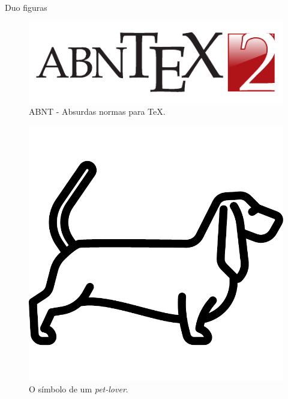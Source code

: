 \documentclass[aspectratio=169]{beamer}
\begin{document}
\begin{frame}{Duo figuras}
\begin{minipage}{0.47\textwidth}
\begin{figure}[hbtp]
	\centering
	\includegraphics[scale=0.3]{figuras/abntex2-modelo-img-marca.pdf}
	\caption{ABNT - Absurdas normas para TeX.} 
	\label{fig:lydenjar2} 
\end{figure}
\end{minipage}
\begin{minipage}{0.5\textwidth}
\begin{figure}[htbp]
	\centering
	\includegraphics[scale=0.3]{figuras/basset2.pdf}
	\caption{O símbolo de um \emph{pet-lover}.} 
	\label{fig:cabo2} 
\end{figure}
\end{minipage}
\end{frame}
\end{document}
